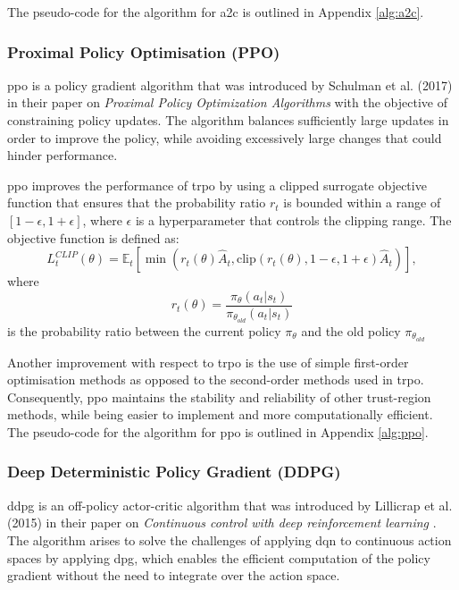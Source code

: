 The pseudo-code for the algorithm for \acrshort{a2c} is outlined in Appendix \ref{alg:a2c}. 

\subsubsection{Proximal Policy Optimisation (PPO)} \label{sec:ppo}

\acrfull{ppo} is a policy gradient algorithm that was introduced by Schulman et al. (2017) in their paper on \textit{Proximal Policy Optimization Algorithms} \cite{Schulman2017} with the objective of constraining policy updates. The algorithm balances sufficiently large updates in order to improve the policy, while avoiding excessively large changes that could hinder performance. 

\acrshort{ppo} improves the performance of \acrfull{trpo} \cite{Schulman2015} by using a clipped surrogate objective function that ensures that the probability ratio $r_t$ is bounded within a range of $[1 - \epsilon, 1 + \epsilon]$, where $\epsilon$ is a hyperparameter that controls the clipping range. The objective function is defined as:
\begin{equation}
    L_t^{CLIP}(\theta) = \mathbb{E}_t \left[\min\left(r_t(\theta) \hat{A}_t, \text{clip}\left(r_t(\theta), 1 - \epsilon, 1 + \epsilon\right) \hat{A}_t\right)\right],
\end{equation}
where
\begin{equation}
    r_t(\theta) = \frac{\pi_\theta(a_t | s_t)}{\pi_{\theta_{old}}(a_t | s_t)}
\end{equation}
is the probability ratio between the current policy $\pi_\theta$ and the old policy $\pi_{\theta_{old}}$

Another improvement with respect to \acrshort{trpo} is the use of simple first-order optimisation methods as opposed to the second-order methods used in \acrshort{trpo}. Consequently, \acrshort{ppo} maintains the stability and reliability of other trust-region methods, while being easier to implement and more computationally efficient. The pseudo-code for the algorithm for \acrshort{ppo} is outlined in Appendix \ref{alg:ppo}.

\subsubsection{Deep Deterministic Policy Gradient (DDPG)} \label{sec:ddpg}

\acrfull{ddpg} is an off-policy actor-critic algorithm that was introduced by Lillicrap et al. (2015) in their paper on \textit{Continuous control with deep reinforcement learning} \cite{Lillicrap2015}. The algorithm arises to solve the challenges of applying \acrlong{dqn} \cite{Mnih2013} to continuous action spaces by applying \acrfull{dpg}, which enables the efficient computation of the policy gradient without the need to integrate over the action space. 

